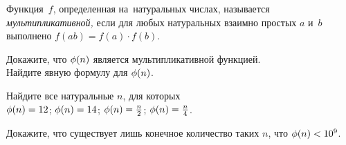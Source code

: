Функция~$f$, определенная на~натуральных числах, называется
\emph{мультипликативной,} если для любых натуральных взаимно простых $a$ и~$b$
выполнено $f(a b) = f(a) \cdot f(b)$.

\begin{problems}

\item
\subproblem
Докажите, что $\phi(n)$ является мультипликативной функцией.
\\
\subproblem
Найдите явную формулу для $\phi(n)$.

\item
Найдите все натуральные $n$, для которых
\\
\subproblem $\phi(n) = 12$;
\quad
\subproblem $\phi(n) = 14$;
\quad
\subproblem $\phi(n) = \frac{n}{2}$;
\quad
\subproblem $\phi(n) = \frac{n}{4}$.

\item
Докажите, что существует лишь конечное количество таких $n$, что
$\phi(n) < 10^{9}$.

\end{problems}

\endgroup %

